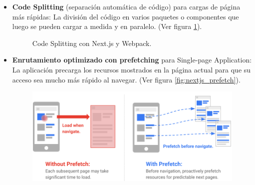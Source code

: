 \documentclass[12pt,twoside,titlepage]{report}
\begin{document}
\begin{itemize}
    \item \textbf{Code Splitting} (separación automática de código) para cargas de página más rápidas: La división del código en varios paquetes o componentes que luego se pueden cargar a medida y en paralelo. (Ver figura \ref{fig:codesplit}).
        \begin{figure}[H]
            \centering
            \caption{Code Splitting con Next.js y Webpack.}
            \label{fig:codesplit}
        \end{figure}
    \item \textbf{Enrutamiento optimizado con prefetching} para Single-page Application: La aplicación precarga los recursos mostrados en la página actual para que su acceso sea mucho más rápido al navegar. (Ver figura \ref{fig:nextjs_prefetch}).
        \begin{figure}[H]
            \centering
            \includegraphics[scale=0.3]{Nextjs/Prefetch}

\end{figure}
\end{itemize}
\end{document}
